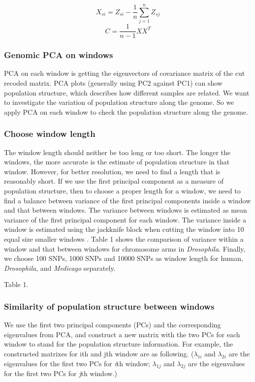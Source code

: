 \documentclass[11pt, oneside]{article}   	%
\begin{document}
{\begin{equation}
X_{si}=Z_{si}-\frac{1}{n}\sum_{j=1}^{n}Z_{sj} 
\end{equation}
\begin{equation}
C=\frac{1}{n-1}XX^{T}
\end{equation}

\subsubsection{Genomic PCA on windows}
PCA on each window is getting the eigenvectors of covariance matrix of the cut recoded matrix. PCA plots (generally using PC2 against PC1) can show population structure, which describes how different samples are related. We want to investigate the variation of population structure along the genome. So we apply PCA on each window to check the population structure along the genome.
\subsubsection{Choose window length}
The window length should neither be too long or too short. The longer the windows, the more accurate is the estimate of population structure in that window. However, for better resolution, we need to find a length that is reasonably short. If we use the first principal component as a measure of population structure, then to choose a proper length for a
window, we need to find a balance between variance of the first principal components inside a window and that between windows. The variance between windows is estimated as mean variance of the first principal component for each window. The variance inside a window is estimated using the jackknife block when cutting the window into 10 equal size smaller windows \cite{key9}. Table 1 shows the comparison of variance within a window and that between windows for chromosome arms in \textit{Drosophila}. Finally, we choose 100 SNPs, 1000 SNPs and 10000 SNPs as window length for human, \textit{Drosophila}, and \textit{Medicago} separately.

Table 1.

\subsubsection{Similarity of population structure between windows}
We use the first two principal components (PCs) and the corresponding eigenvalues from PCA, and construct a new matrix with the two PCs for each window to stand for the population structure information. For example, the constructed matrixes for ith and jth window are as following. ($\lambda _{1i}$ and $\lambda _{2i}$ are the eigenvalues for the first two PCs for \textit{i}th window; $\lambda _{1j}$ and $\lambda _{2j}$ are the eigenvalues for the first two PCs for \textit{j}th window.)

}
\end{document}
